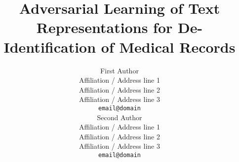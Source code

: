 \documentclass[11pt,a4paper]{article}
\title{Adversarial Learning of Text Representations for De-Identification of Medical Records}
\author{First Author \\
    Affiliation / Address line 1 \\
    Affiliation / Address line 2 \\
    Affiliation / Address line 3 \\
    {\tt email@domain} \\\And
    Second Author \\
    Affiliation / Address line 1 \\
    Affiliation / Address line 2 \\
    Affiliation / Address line 3 \\
    {\tt email@domain} \\}
\date{}
\begin{document}
\maketitle


\acresetall



%
%


\end{document}
